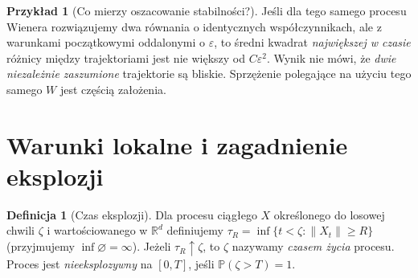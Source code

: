 \documentclass[11pt,a4paper,oneside]{report}
\numberwithin{equation}{chapter}
\theoremstyle{plain}
\theoremstyle{definition}
\newtheorem{definicja}{Definicja}[chapter]
\newtheorem{przyklad}{Przykład}[chapter]
\theoremstyle{remark}
\newcommand{\R}{\mathbb{R}}
\newcommand{\Prob}{\mathbb{P}}
\newcommand{\norm}[1]{\lVert #1\rVert}
\begin{document}
\begin{przyklad}[Co mierzy oszacowanie stabilności?]
Jeśli dla tego samego procesu Wienera rozwiązujemy
dwa równania o identycznych współczynnikach, ale
z warunkami początkowymi oddalonymi o $\varepsilon$,
to średni kwadrat \emph{największej w czasie} różnicy
między trajektoriami jest nie większy od $C\varepsilon^2$.
Wynik nie mówi, że \emph{dwie niezależnie zaszumione}
trajektorie są bliskie. Sprzężenie polegające na
użyciu tego samego $W$ jest częścią założenia.
\end{przyklad}

\section{Warunki lokalne i zagadnienie eksplozji}
\begin{definicja}[Czas eksplozji]
Dla procesu ciągłego $X$ określonego do losowej chwili
$\zeta$ i wartościowanego w $\R^d$ definiujemy
$\tau_R=\inf\{t<\zeta:\norm{X_t}\ge R\}$
(przyjmujemy $\inf\varnothing=\infty$).
Jeżeli $\tau_R\uparrow\zeta$, to $\zeta$ nazywamy
\emph{czasem życia} procesu. Proces jest
\emph{nieeksplozywny} na $[0,T]$, jeśli $\Prob(\zeta>T)=1$.
\end{definicja}
\end{document}

